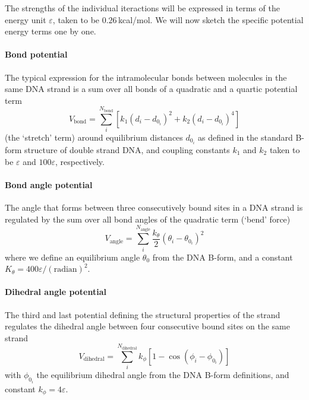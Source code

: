 The strengths of the individual iteractions will be expressed in terms of the energy unit $\varepsilon$, taken to be $0.26$\,kcal/mol.
We will now sketch the specific potential energy terms one by one.

\paragraph{Bond potential} The typical expression for the intramolecular bonds between molecules in the same DNA strand is a sum over all bonds of a quadratic and a quartic potential term
\begin{equation}
V_{\text{bond}} = \sum_i^{N_{\text{bond}}} \left[ k_1 \left(d_i - d_{0_i}\right)^2 + k_2 \left(d_i - d_{0_i}\right)^4\right]
\end{equation}
(the `stretch' term) around equilibrium distances $d_{0_i}$ as defined in the standard B-form structure of double strand DNA, and coupling constants $k_1$ and $k_2$ taken to be $\varepsilon$ and $100 \varepsilon$, respectively.

\paragraph{Bond angle potential} The angle that forms between three consecutively bound sites in a DNA strand is regulated by the sum over all bond angles of the quadratic term (`bend' force)
\begin{equation}
V_\text{angle} =  \sum_i^{N_\text{angle}} \frac{k_\theta}{2} \left( \theta_i - \theta_{0_i} \right)^2
\end{equation}
where we define an equilibrium angle $\theta_0$ from the DNA B-form, and a constant $K_\theta = 400\varepsilon / (\text{radian})^ 2$.

\paragraph{Dihedral angle potential} The third and last potential defining the structural properties of the strand regulates the dihedral angle between four consecutive bound sites on the same strand
\begin{equation}
V_\text{dihedral} =  \sum_i^{N_\text{dihedral}} k_\phi \left[ 1 - \cos (\phi_i - \phi_{0_i}) \right]
\end{equation}
with $\phi_{0_i}$ the equilibrium dihedral angle from the DNA B-form definitions, and constant $k_\phi = 4\varepsilon$.

